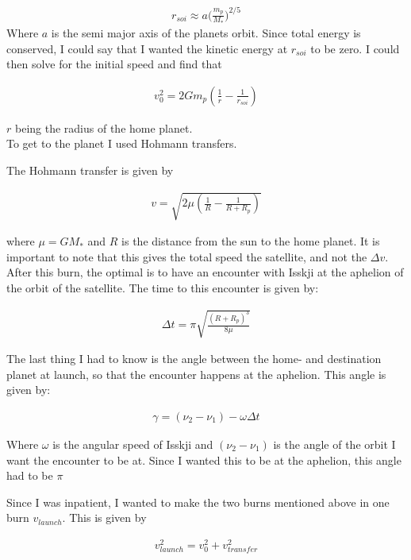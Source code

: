 \documentclass[a4paper, 10pt]{article}
\begin{document}
\begin{align}
r_{soi} \approx a \big( \frac{m_p}{M_*} \big) ^{2/5}
\end{align}
Where $a$ is the semi major axis of the planets orbit. Since total energy is conserved, I could say that I wanted the kinetic energy at $r_{soi}$ to be zero. I could then solve for the initial speed and find that 

\begin{align}
v_{0}^2 = 2Gm_p \left( \frac{1}{r} - \frac{1}{r_{soi}} \right) 
\end{align}

$r$ being the radius of the home planet. \\

To get to the planet I used Hohmann transfers\cite{SpaceDynamics}.

The Hohmann transfer is given by

\begin{align}
v = \sqrt{2\mu \left( \frac{1}{R} - \frac{1}{R + R_p} \right)}
\end{align}

where $\mu = GM_*$ and $R$ is the distance from the sun to the home planet. It is important to note that this gives the total speed the satellite, and not the $\Delta v$. \\

After this burn, the optimal is to have an encounter with Isskji at the aphelion of the orbit of the satellite. The time to this encounter is given by:

\begin{align}
\Delta t = \pi \sqrt{\frac{(R +R_p)^3}{8\mu}}
\end{align}

The last thing I had to know is the angle between the home- and destination planet at launch, so that the encounter happens at the aphelion. This angle is given by:

\begin{align}
\gamma = (\nu_2 -\nu_1) - \omega \Delta t
\end{align}

Where $\omega$ is the angular speed of Isskji and $(\nu_2 -\nu_1)$ is the angle of the orbit I want the encounter to be at. Since I wanted this to be at the aphelion, this angle had to be $\pi$

Since I was inpatient, I wanted to make the two burns mentioned above in one burn $v_{launch}$. This is given by

\begin{align}
v_{launch}^2 = v_0^2 + v_{transfer}^2
\end{align} 
\end{document}
